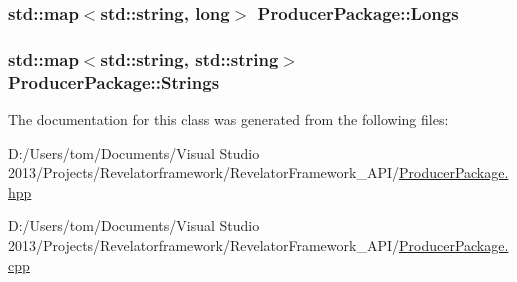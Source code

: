 \hypertarget{class_producer_package_a40a935d0c8cf30f70c30491ca063c750}{
\subsubsection[{Longs}]{\setlength{\rightskip}{0pt plus 5cm}std\-::map$<$std\-::string, long$>$ Producer\-Package\-::\-Longs\hspace{0.3cm}{\ttfamily [private]}}}\label{class_producer_package_a40a935d0c8cf30f70c30491ca063c750}
\hypertarget{class_producer_package_aaff12a94ce8d3659e6258d03d6a6121a}{
\subsubsection[{Strings}]{\setlength{\rightskip}{0pt plus 5cm}std\-::map$<$std\-::string, std\-::string$>$ Producer\-Package\-::\-Strings\hspace{0.3cm}{\ttfamily [private]}}}\label{class_producer_package_aaff12a94ce8d3659e6258d03d6a6121a}


The documentation for this class was generated from the following files\-:\begin{DoxyCompactItemize}
\item 
D\-:/\-Users/tom/\-Documents/\-Visual Studio 2013/\-Projects/\-Revelatorframework/\-Revelator\-Framework\-\_\-\-A\-P\-I/\hyperlink{_producer_package_8hpp}{Producer\-Package.\-hpp}\item 
D\-:/\-Users/tom/\-Documents/\-Visual Studio 2013/\-Projects/\-Revelatorframework/\-Revelator\-Framework\-\_\-\-A\-P\-I/\hyperlink{_producer_package_8cpp}{Producer\-Package.\-cpp}\end{DoxyCompactItemize}
